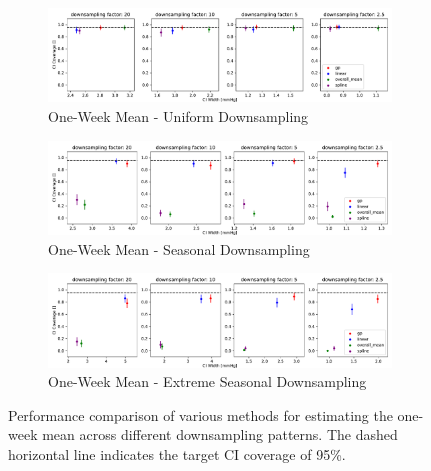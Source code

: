\begin{figure}[!htb]
\centering
\begin{subfigure}{\textwidth}
    \centering
    \includegraphics[width=\linewidth]{Pictures/final_experiments_spline_ridge_quantile_max100/overall_mean_eval_sin_rbf_default}
    \caption{One-Week Mean - Uniform Downsampling}
    \label{fig:weekly-mean-uniform-sampling-performance}
\end{subfigure}

\bigskip

\begin{subfigure}{\textwidth}
    \centering
    \includegraphics[width=\linewidth]{Pictures/final_experiments_spline_ridge_quantile_max100/overall_mean_eval_sin_rbf_seasonal_default}
    \caption{One-Week Mean - Seasonal Downsampling}
    \label{fig:weekly-mean-seasonal-sampling-performance}
\end{subfigure}

\bigskip

\begin{subfigure}{\textwidth}
    \centering
    \includegraphics[width=\linewidth]{Pictures/final_experiments_spline_ridge_quantile_max100/overall_mean_eval_sin_rbf_seasonal_extreme}
    \caption{One-Week Mean - Extreme Seasonal Downsampling}
    \label{fig:weekly-mean-extreme-seasonal-sampling-performance}
\end{subfigure}

\caption[One-Week Mean Performance]{
    Performance comparison of various methods for
estimating the one-week mean across different downsampling patterns.
    The dashed horizontal line indicates the target CI coverage of 95\%.
}
\label{fig:weekly-mean-performance}
\end{figure}




